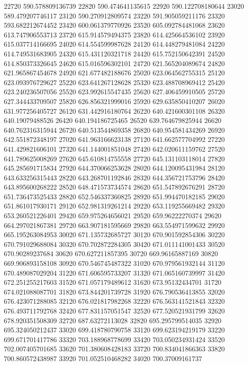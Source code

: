 {22720 590.578809136739
22820 590.474641135615
22920 590.122708180644
23020 589.479207746117
23120 590.270912809574
23220 591.905059211176
23320 593.682212674452
23420 600.061379770926
23520 605.092784481068
23620 613.747906553713
23720 615.914579494375
23820 614.425664536102
23920 615.037714166695
24020 614.554599987628
24120 614.448279481084
24220 614.749531683905
24320 615.431120321718
24420 615.752150642391
24520 614.850373326645
24620 615.016596302101
24720 621.565204089674
24820 621.965867454678
24920 621.677482188676
25020 623.064562755315
25120 623.093976729627
25220 623.641267128628
25320 623.488708969412
25420 623.240236507056
25520 623.992615547435
25620 627.406459910505
25720 627.344433709507
25820 626.856321999016
25920 629.635850410207
26020 631.977256405727
26120 631.442916180764
26220 640.421600301108
26320 640.19079488526
26420 640.194186725465
26520 639.764679825944
26620 640.762316315944
26720 640.513544869358
26820 640.954581434269
26920 642.551872348197
27020 641.963166623138
27120 641.662577704992
27220 641.429821606101
27320 641.144001851048
27420 642.020611159762
27520 641.789625008269
27620 645.610814755558
27720 645.131103118014
27820 645.285691715834
27920 644.370066253628
28020 644.120095431984
28120 643.633256315443
28220 643.268701192846
28320 644.356721753796
28420 643.895600268222
28520 648.471573734574
28620 651.547892676291
28720 651.736473525433
28820 652.546337360825
28920 651.994470182185
29020 651.861017930171
29120 652.981319261214
29220 653.119255669482
29320 653.260521226401
29420 659.975264656021
29520 659.96222270374
29620 664.297021867381
29720 663.907181595669
29820 663.554971599632
29920 665.195263084953
30020 671.135732685727
30120 670.901592854306
30220 670.791029688084
30320 670.702872284305
30420 671.011141001433
30520 670.90289237684
30620 670.627211857395
30720 669.96165887169
30820 669.906893158108
30920 670.546745487322
31020 670.979561932144
31120 670.489087029204
31220 671.606595733207
31320 671.065160739997
31420 672.251255217603
31520 671.057179489612
31620 673.95132434701
31720 674.021088087701
31820 673.844201739728
31920 676.790536413855
32020 676.423071288085
32120 676.021817982268
32220 676.563141521843
32320 676.493711792768
32420 677.831157051547
32520 677.520521931799
32620 678.920351508309
32720 687.63272113028
32820 695.295799514035
32920 695.324050212437
33020 699.418780790758
33120 699.623194219179
33220 699.671701417786
33320 703.188968778699
33420 703.050234931424
33520 702.007405701685
33620 701.380608428183
33720 700.834041866363
33820 700.860572438987
33920 701.052510468282
34020 700.37009161737
}
